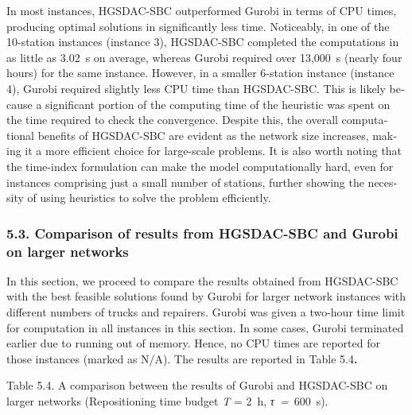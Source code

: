 \documentclass[
  english,
]{article}
\begin{document}
\begin{otherlanguage}{english}
\protect{}\label{p0645}
In most instances, HGSDAC-SBC outperformed Gurobi in terms of CPU times, producing optimal solutions
in significantly less time. Noticeably, in one of the 10-station instances (instance 3), HGSDAC-SBC
completed the computations in as little as 3.02~s on average, whereas Gurobi required over 13,000~s
(nearly four hours) for the same instance. However, in a smaller 6-station instance (instance 4),
Gurobi required slightly less CPU time than HGSDAC-SBC. This is likely because a significant portion
of the computing time of the heuristic was spent on the time required to check the convergence.
Despite this, the overall computational benefits of HGSDAC-SBC are evident as the network size
increases, making it a more efficient choice for large-scale problems. It is also worth noting that
the time-index formulation can make the model computationally hard, even for instances comprising
just a small number of stations, further showing the necessity of using heuristics to solve the
problem efficiently.

\protect{}\label{s0120}
\subsubsection{5.3. Comparison of results from HGSDAC-SBC and Gurobi on larger
networks}\label{st140}

\protect{}\label{p0650}
In this section, we proceed to compare the results obtained from HGSDAC-SBC with the best feasible
solutions found by Gurobi for larger network instances with different numbers of trucks and
repairers. Gurobi was given a two-hour time limit for computation in all instances in this section.
In some cases, Gurobi terminated earlier due to running out of memory. Hence, no CPU times are
reported for those instances (marked as N/A). The results are reported in Table 5.4\textbf{.}

\protect{}\label{t0025}
Table 5.4. A comparison between the results of Gurobi and HGSDAC-SBC on larger networks
(Repositioning time budget \emph{T} = 2~h, \emph{τ~=}~600~s).


\end{otherlanguage}
\end{document}
